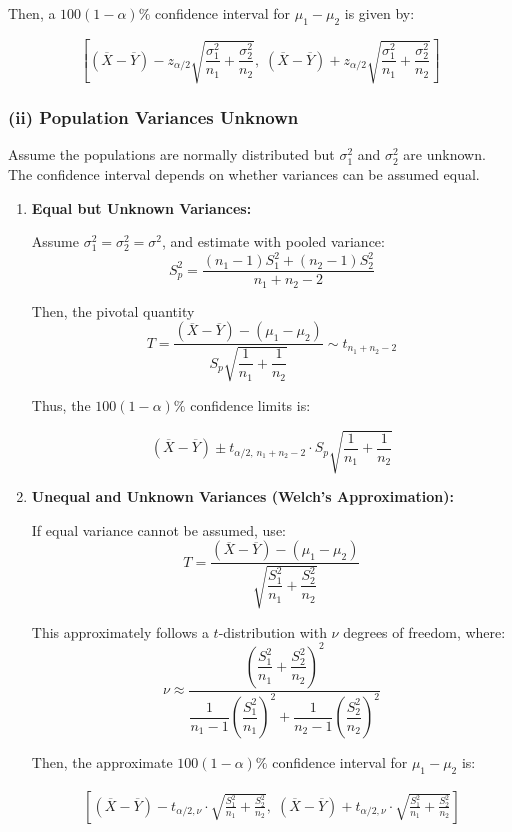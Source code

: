 \documentclass[twoside]{book}
\begin{document}
Then, a \(100(1 - \alpha)\%\) confidence interval for \(\mu_1 - \mu_2\) is given by:
\begin{textbox}
\[
\left[
(\overline{X} - \overline{Y}) - z_{\alpha/2} \sqrt{\frac{\sigma_1^2}{n_1} + \frac{\sigma_2^2}{n_2}}, \;
(\overline{X} - \overline{Y}) + z_{\alpha/2} \sqrt{\frac{\sigma_1^2}{n_1} + \frac{\sigma_2^2}{n_2}}
\right]
\]
\end{textbox}

\subsubsection*{(ii) Population Variances Unknown}

Assume the populations are normally distributed but \(\sigma_1^2\) and \(\sigma_2^2\) are unknown. The confidence interval depends on whether variances can be assumed equal.

\begin{enumerate}[label=(\alph*)]
	\item \textbf{Equal but Unknown Variances:}

Assume \(\sigma_1^2 = \sigma_2^2 = \sigma^2\), and estimate with pooled variance:
\[
S_p^2 = \frac{(n_1 - 1)S_1^2 + (n_2 - 1)S_2^2}{n_1 + n_2 - 2}
\]

Then, the pivotal quantity
\[
T = \frac{(\overline{X} - \overline{Y}) - (\mu_1 - \mu_2)}{S_p \sqrt{\dfrac{1}{n_1} + \dfrac{1}{n_2}}} \sim t_{n_1 + n_2 - 2}
\]

Thus, the \(100(1 - \alpha)\%\) confidence limits is:
\begin{textbox}
\[
(\overline{X} - \overline{Y}) \pm t_{\alpha/2, \, n_1 + n_2 - 2} \cdot S_p \sqrt{\frac{1}{n_1} + \frac{1}{n_2}}
\]
\end{textbox}

\item \textbf{Unequal and Unknown Variances (Welch's Approximation):}

If equal variance cannot be assumed, use:
\[
T = \dfrac{(\overline{X} - \overline{Y}) - (\mu_1 - \mu_2)}{\sqrt{\dfrac{S_1^2}{n_1} + \dfrac{S_2^2}{n_2}}}
\]

This approximately follows a \(t\)-distribution with $\nu$ degrees of freedom, where:
\[
\nu \approx \dfrac{\left( \dfrac{S_1^2}{n_1} + \dfrac{S_2^2}{n_2} \right)^2}{\dfrac{1}{n_1 - 1}\left(\dfrac{S_1^2}{n_1} \right)^2 + \dfrac{1}{n_2 - 1}\left( \dfrac{S_2^2}{n_2}\right)^2}
\]

Then, the approximate \(100(1 - \alpha)\%\) confidence interval for \(\mu_1 - \mu_2\) is:
\begin{textbox}
\begin{align*}
\left[
(\overline{X} - \overline{Y}) - t_{\alpha/2, \nu} \cdot \sqrt{\frac{S_1^2}{n_1} + \frac{S_2^2}{n_2}}, \;
(\overline{X} - \overline{Y}) + t_{\alpha/2, \nu} \cdot \sqrt{\frac{S_1^2}{n_1} + \frac{S_2^2}{n_2}}
\right]
\end{align*}
\end{textbox}
\end{enumerate}
\end{document}

